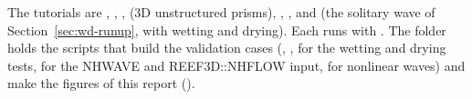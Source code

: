 The tutorials are , ,
,  (3D unstructured prisms),
, ,  and
 (the solitary wave of Section~\ref{sec:wd-runup}, with
wetting and drying). Each runs with . The folder
 holds the scripts that build the validation cases
(, ,  for the wetting and
drying tests,  for the NHWAVE and REEF3D::NHFLOW input,
 for nonlinear waves) and make the figures of this
report ().
